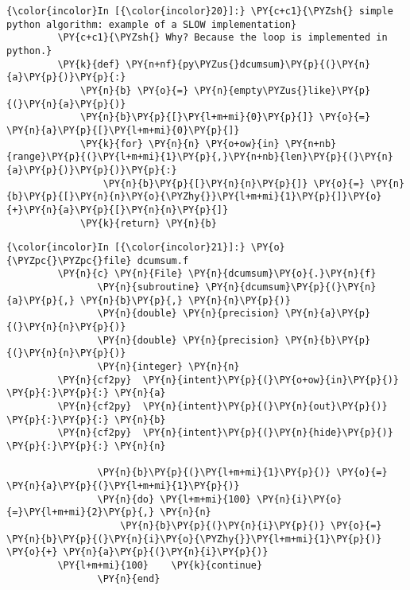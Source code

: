     \begin{Verbatim}[commandchars=\\\{\}]
{\color{incolor}In [{\color{incolor}20}]:} \PY{c+c1}{\PYZsh{} simple python algorithm: example of a SLOW implementation}
         \PY{c+c1}{\PYZsh{} Why? Because the loop is implemented in python.}
         \PY{k}{def} \PY{n+nf}{py\PYZus{}dcumsum}\PY{p}{(}\PY{n}{a}\PY{p}{)}\PY{p}{:}
             \PY{n}{b} \PY{o}{=} \PY{n}{empty\PYZus{}like}\PY{p}{(}\PY{n}{a}\PY{p}{)}
             \PY{n}{b}\PY{p}{[}\PY{l+m+mi}{0}\PY{p}{]} \PY{o}{=} \PY{n}{a}\PY{p}{[}\PY{l+m+mi}{0}\PY{p}{]}
             \PY{k}{for} \PY{n}{n} \PY{o+ow}{in} \PY{n+nb}{range}\PY{p}{(}\PY{l+m+mi}{1}\PY{p}{,}\PY{n+nb}{len}\PY{p}{(}\PY{n}{a}\PY{p}{)}\PY{p}{)}\PY{p}{:}
                 \PY{n}{b}\PY{p}{[}\PY{n}{n}\PY{p}{]} \PY{o}{=} \PY{n}{b}\PY{p}{[}\PY{n}{n}\PY{o}{\PYZhy{}}\PY{l+m+mi}{1}\PY{p}{]}\PY{o}{+}\PY{n}{a}\PY{p}{[}\PY{n}{n}\PY{p}{]}
             \PY{k}{return} \PY{n}{b}
\end{Verbatim}



    \begin{Verbatim}[commandchars=\\\{\}]
{\color{incolor}In [{\color{incolor}21}]:} \PY{o}{\PYZpc{}\PYZpc{}file} dcumsum.f
         \PY{n}{c} \PY{n}{File} \PY{n}{dcumsum}\PY{o}{.}\PY{n}{f}
                \PY{n}{subroutine} \PY{n}{dcumsum}\PY{p}{(}\PY{n}{a}\PY{p}{,} \PY{n}{b}\PY{p}{,} \PY{n}{n}\PY{p}{)}
                \PY{n}{double} \PY{n}{precision} \PY{n}{a}\PY{p}{(}\PY{n}{n}\PY{p}{)}
                \PY{n}{double} \PY{n}{precision} \PY{n}{b}\PY{p}{(}\PY{n}{n}\PY{p}{)}
                \PY{n}{integer} \PY{n}{n}
         \PY{n}{cf2py}  \PY{n}{intent}\PY{p}{(}\PY{o+ow}{in}\PY{p}{)} \PY{p}{:}\PY{p}{:} \PY{n}{a}
         \PY{n}{cf2py}  \PY{n}{intent}\PY{p}{(}\PY{n}{out}\PY{p}{)} \PY{p}{:}\PY{p}{:} \PY{n}{b}
         \PY{n}{cf2py}  \PY{n}{intent}\PY{p}{(}\PY{n}{hide}\PY{p}{)} \PY{p}{:}\PY{p}{:} \PY{n}{n}
         
                \PY{n}{b}\PY{p}{(}\PY{l+m+mi}{1}\PY{p}{)} \PY{o}{=} \PY{n}{a}\PY{p}{(}\PY{l+m+mi}{1}\PY{p}{)}
                \PY{n}{do} \PY{l+m+mi}{100} \PY{n}{i}\PY{o}{=}\PY{l+m+mi}{2}\PY{p}{,} \PY{n}{n}
                    \PY{n}{b}\PY{p}{(}\PY{n}{i}\PY{p}{)} \PY{o}{=} \PY{n}{b}\PY{p}{(}\PY{n}{i}\PY{o}{\PYZhy{}}\PY{l+m+mi}{1}\PY{p}{)} \PY{o}{+} \PY{n}{a}\PY{p}{(}\PY{n}{i}\PY{p}{)}
         \PY{l+m+mi}{100}    \PY{k}{continue}
                \PY{n}{end}
\end{Verbatim}

